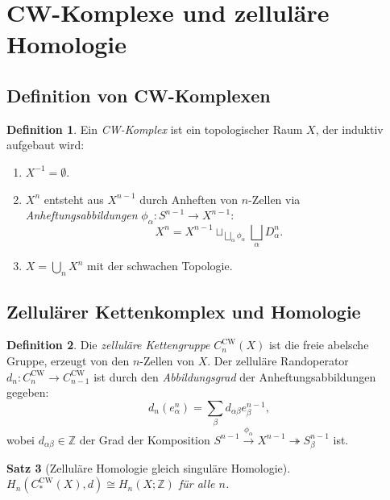 \documentclass[12pt,a4paper]{amsart}
\newtheorem{theorem}{Satz}[section]
\theoremstyle{definition}
\newtheorem{definition}[theorem]{Definition}
\begin{document}
\section{CW-Komplexe und zellul\"are Homologie}
\label{sec:cw}

\subsection{Definition von CW-Komplexen}

\begin{definition}
Ein \emph{CW-Komplex} ist ein topologischer Raum $X$, der induktiv aufgebaut wird:
\begin{enumerate}[label=(\roman*)]
  \item $X^{-1} = \emptyset$.
  \item $X^n$ entsteht aus $X^{n-1}$ durch Anheften von $n$-Zellen via
    \emph{Anheftungsabbildungen} $\phi_\alpha\colon S^{n-1} \to X^{n-1}$:
    \[
      X^n = X^{n-1} \sqcup_{\bigsqcup_\alpha \phi_\alpha}
        \bigsqcup_\alpha D^n_\alpha.
    \]
  \item $X = \bigcup_n X^n$ mit der schwachen Topologie.
\end{enumerate}
\end{definition}

\subsection{Zellul\"arer Kettenkomplex und Homologie}

\begin{definition}
Die \emph{zellul\"are Kettengruppe} $C_n^{\mathrm{CW}}(X)$ ist die freie abelsche
Gruppe, erzeugt von den $n$-Zellen von $X$. Der zellul\"are Randoperator
$d_n\colon C_n^{\mathrm{CW}} \to C_{n-1}^{\mathrm{CW}}$ ist durch den
\emph{Abbildungsgrad} der Anheftungsabbildungen gegeben:
\[
  d_n(e^n_\alpha) = \sum_\beta d_{\alpha\beta} e^{n-1}_\beta,
\]
wobei $d_{\alpha\beta} \in \mathbb{Z}$ der Grad der Komposition
$S^{n-1} \xrightarrow{\phi_\alpha} X^{n-1} \twoheadrightarrow S^{n-1}_\beta$
ist.
\end{definition}

\begin{theorem}[Zellul\"are Homologie gleich singul\"are Homologie]
$H_n(C_*^{\mathrm{CW}}(X), d) \cong H_n(X;\mathbb{Z})$ f\"ur alle $n$.
\end{theorem}
\end{document}
